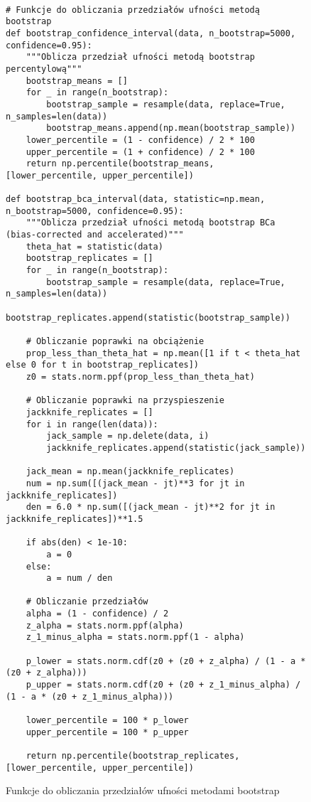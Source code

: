 \documentclass[12pt,a4paper]{article}
\newcommand{\kod}[2]{
    \begin{figure}[H]
        \begin{lstlisting}[style=pythonstyle]
#1
        \end{lstlisting}
        \caption{#2}
    \end{figure}
}
\begin{document}
\kod{
# Funkcje do obliczania przedziałów ufności metodą bootstrap
def bootstrap_confidence_interval(data, n_bootstrap=5000, confidence=0.95):
    """Oblicza przedział ufności metodą bootstrap percentylową"""
    bootstrap_means = []
    for _ in range(n_bootstrap):
        bootstrap_sample = resample(data, replace=True, n_samples=len(data))
        bootstrap_means.append(np.mean(bootstrap_sample))
    lower_percentile = (1 - confidence) / 2 * 100
    upper_percentile = (1 + confidence) / 2 * 100
    return np.percentile(bootstrap_means, [lower_percentile, upper_percentile])

def bootstrap_bca_interval(data, statistic=np.mean, n_bootstrap=5000, confidence=0.95):
    """Oblicza przedział ufności metodą bootstrap BCa (bias-corrected and accelerated)"""
    theta_hat = statistic(data)
    bootstrap_replicates = []
    for _ in range(n_bootstrap):
        bootstrap_sample = resample(data, replace=True, n_samples=len(data))
        bootstrap_replicates.append(statistic(bootstrap_sample))
    
    # Obliczanie poprawki na obciążenie
    prop_less_than_theta_hat = np.mean([1 if t < theta_hat else 0 for t in bootstrap_replicates])
    z0 = stats.norm.ppf(prop_less_than_theta_hat)
    
    # Obliczanie poprawki na przyspieszenie
    jackknife_replicates = []
    for i in range(len(data)):
        jack_sample = np.delete(data, i)
        jackknife_replicates.append(statistic(jack_sample))
    
    jack_mean = np.mean(jackknife_replicates)
    num = np.sum([(jack_mean - jt)**3 for jt in jackknife_replicates])
    den = 6.0 * np.sum([(jack_mean - jt)**2 for jt in jackknife_replicates])**1.5
    
    if abs(den) < 1e-10:
        a = 0
    else:
        a = num / den
    
    # Obliczanie przedziałów
    alpha = (1 - confidence) / 2
    z_alpha = stats.norm.ppf(alpha)
    z_1_minus_alpha = stats.norm.ppf(1 - alpha)
    
    p_lower = stats.norm.cdf(z0 + (z0 + z_alpha) / (1 - a * (z0 + z_alpha)))
    p_upper = stats.norm.cdf(z0 + (z0 + z_1_minus_alpha) / (1 - a * (z0 + z_1_minus_alpha)))
    
    lower_percentile = 100 * p_lower
    upper_percentile = 100 * p_upper
    
    return np.percentile(bootstrap_replicates, [lower_percentile, upper_percentile])
}{Funkcje do obliczania przedziałów ufności metodami bootstrap}
\end{document}
